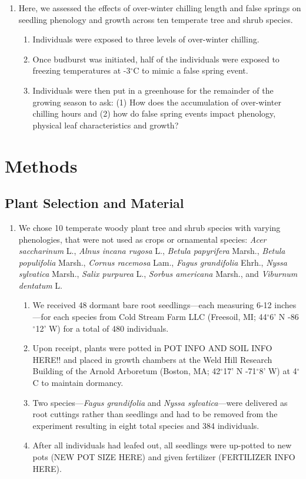 \documentclass{article}\usepackage[]{graphicx}\usepackage[]{color}
\begin{document}
\begin{enumerate}
\item Here, we assessed the effects of over-winter chilling length and false springs on seedling phenology and growth across ten temperate tree and shrub species. 
  \begin{enumerate}
  \item Individuals were exposed to three levels of over-winter chilling. 
  \item Once budburst was initiated, half of the individuals were exposed to freezing temperatures at -3$^{\circ}$C to mimic a false spring event. 
  \item Individuals were then put in a greenhouse for the remainder of the growing season to ask: (1) How does the accumulation of over-winter chilling hours and (2) how do false spring events impact phenology, physical leaf characteristics and growth?
  \end{enumerate}
\end{enumerate}
  
\section*{Methods}
\subsection*{Plant Selection and Material}
\begin{enumerate}
\item We chose 10 temperate woody plant tree and shrub species with varying phenologies, that were not used as crops or ornamental species: \textit{Acer saccharinum} L., \textit{Alnus incana rugosa} L., \textit{Betula papyrifera} Marsh., \textit{Betula populifolia} Marsh., \textit{Cornus racemosa} Lam., \textit{Fagus grandifolia} Ehrh., \textit{Nyssa sylvatica} Marsh., \textit{Salix purpurea} L., \textit{Sorbus americana} Marsh., and \textit{Viburnum dentatum} L.
  \begin{enumerate}
  \item We received 48 dormant bare root seedlings---each measuring 6-12 inches---for each species from Cold Stream Farm LLC (Freesoil, MI; 44$^{\circ}$6' N -86$^{\circ}$12' W) for a total of 480 individuals.
  \item Upon receipt, plants were potted in POT INFO AND SOIL INFO HERE!! and placed in growth chambers at the Weld Hill Research Building of the Arnold Arboretum (Boston, MA; 42$^{\circ}$17' N -71$^{\circ}$8' W) at 4$^{\circ}$C to maintain dormancy.
  \item Two species---\textit{Fagus grandifolia} and \textit{Nyssa sylvatica}---were delivered as root cuttings rather than seedlings and had to be removed from the experiment resulting in eight total species and 384 individuals.
  \item After all individuals had leafed out, all seedlings were up-potted to new pots (NEW POT SIZE HERE) and given fertilizer (FERTILIZER INFO HERE).
  \end{enumerate}
\end{enumerate}
\end{document}

